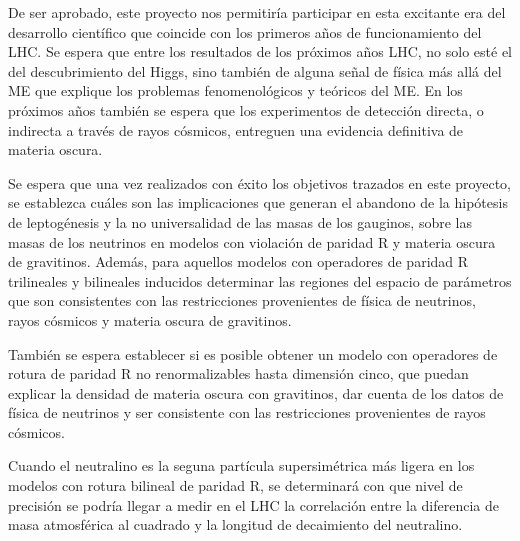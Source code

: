 De ser aprobado, este proyecto nos permitiría participar en esta
excitante era del desarrollo científico que coincide con
los primeros años de funcionamiento del LHC.  Se espera que entre los
resultados de los próximos años LHC, no solo esté el del
descubrimiento del Higgs, sino también de alguna señal de física más
allá del ME que explique los problemas fenomenológicos y
teóricos del ME. En los próximos años también se espera
que los experimentos de detección directa, o indirecta a través de
rayos cósmicos, entreguen una evidencia definitiva de materia oscura.


\begin{gravitinodm}
  Se espera que una vez realizados con éxito los objetivos trazados en
  este proyecto, se establezca cuáles son las implicaciones que
  generan el abandono de la hipótesis de leptogénesis y la no
  universalidad de las masas de los gauginos, sobre las masas de los
  neutrinos en modelos con violación de paridad R y materia oscura de
  gravitinos. Además, para aquellos modelos con operadores de paridad R trilineales
  y bilineales inducidos determinar las regiones del espacio de
  parámetros que son consistentes con las restricciones provenientes
  de física de neutrinos, rayos cósmicos y materia oscura de gravitinos. 
\end{gravitinodm}

\begin{bbrpvlhc}
  También se espera establecer si es posible obtener un modelo con
  operadores de rotura de paridad R no renormalizables hasta dimensión
  cinco, que puedan explicar la densidad de materia oscura con
  gravitinos, dar cuenta de los datos de física de neutrinos y ser
  consistente con las restricciones provenientes de rayos cósmicos.
\end{bbrpvlhc}

\begin{brpvlhc}
  Cuando el neutralino es la seguna partícula supersimétrica más
  ligera en los modelos con rotura bilineal de paridad R, se
  determinará con que nivel de precisión se podría llegar a medir en
  el LHC la correlación entre la diferencia de masa atmosférica al
  cuadrado y la longitud de decaimiento del neutralino.
\end{brpvlhc}


